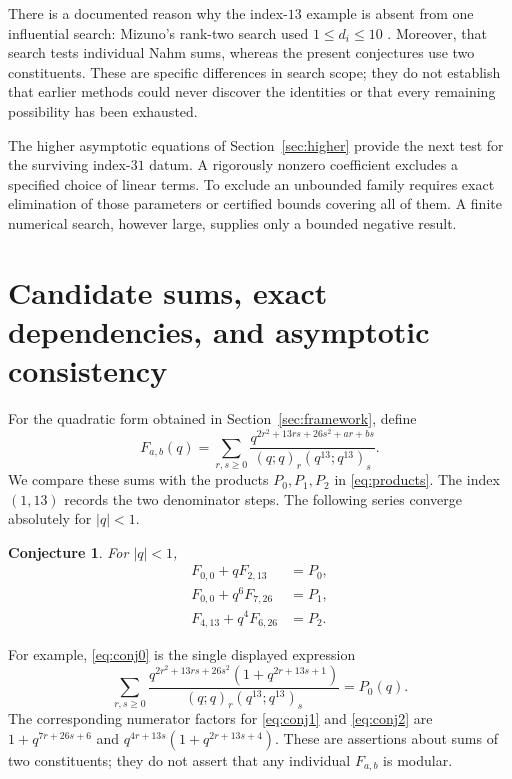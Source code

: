 \documentclass[11pt,reqno]{amsart}
\newtheorem{conjecture}[theorem]{Conjecture}
\theoremstyle{remark}
\numberwithin{equation}{section}
\begin{document}
There is a documented reason why the index-$13$ example is absent from
one influential search: Mizuno's rank-two search used $1\le d_i\le10$
\cite[Section~4]{Mizuno}. Moreover, that search tests individual Nahm
sums, whereas the present conjectures use two constituents. These are
specific differences in search scope; they do not establish that earlier
methods could never discover the identities or that every remaining
possibility has been exhausted.

The higher asymptotic equations of Section~\ref{sec:higher} provide the
next test for the surviving index-$31$ datum. A rigorously nonzero
coefficient excludes a specified choice of linear terms. To exclude an
unbounded family requires exact elimination of those parameters or
certified bounds covering all of them. A finite numerical search, however
large, supplies only a bounded negative result.
\section{Candidate sums, exact dependencies, and asymptotic consistency}
\label{sec:conjectures}
For the quadratic form obtained in Section~\ref{sec:framework}, define
\begin{equation}\label{eq:Fdef}
 F_{a,b}(q)=\sum_{r,s\geq0}
 \frac{q^{2r^2+13rs+26s^2+ar+bs}}{(q;q)_r(q^{13};q^{13})_s}.
\end{equation}
We compare these sums with the products $P_0,P_1,P_2$ in
\eqref{eq:products}. The index $(1,13)$ records the two denominator steps.
The following series converge absolutely for $|q|<1$.
\begin{conjecture}\label{conj:products}
For $|q|<1$,
\begin{align}
 F_{0,0}+qF_{2,13}&=P_0,\label{eq:conj0}\\
 F_{0,0}+q^6F_{7,26}&=P_1,\label{eq:conj1}\\
 F_{4,13}+q^4F_{6,26}&=P_2.\label{eq:conj2}
\end{align}
\end{conjecture}
For example, \eqref{eq:conj0} is the single displayed expression
\[
 \sum_{r,s\geq0}
 \frac{q^{2r^2+13rs+26s^2}(1+q^{2r+13s+1})}
 {(q;q)_r(q^{13};q^{13})_s}=P_0(q).
\]
The corresponding numerator factors for \eqref{eq:conj1} and
\eqref{eq:conj2} are $1+q^{7r+26s+6}$ and
$q^{4r+13s}(1+q^{2r+13s+4})$. These are assertions about sums of two
constituents; they do not assert that any individual $F_{a,b}$ is modular.
\end{document}
